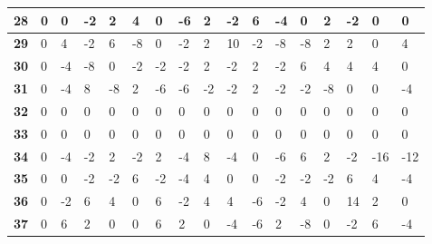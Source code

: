\begin{longtable}[c]{|l|l|l|l|l|l|l|l|l|l|l|l|l|l|l|l|l|}
\textbf{28} & 0          & 0          & -2         & 2          & 4          & 0          & -6         & 2          & -2         & 6          & -4          & 0           & 2           & -2          & 0           & 0           \\ \hline
\textbf{29} & 0          & 4          & -2         & 6          & -8         & 0          & -2         & 2          & 10         & -2         & -8          & -8          & 2           & 2           & 0           & 4           \\ \hline
\textbf{30} & 0          & -4         & -8         & 0          & -2         & -2         & -2         & 2          & -2         & 2          & -2          & 6           & 4           & 4           & 4           & 0           \\ \hline
\textbf{31} & 0          & -4         & 8          & -8         & 2          & -6         & -6         & -2         & -2         & 2          & -2          & -2          & -8          & 0           & 0           & -4          \\ \hline
\textbf{32} & 0          & 0          & 0          & 0          & 0          & 0          & 0          & 0          & 0          & 0          & 0           & 0           & 0           & 0           & 0           & 0           \\ \hline
\textbf{33} & 0          & 0          & 0          & 0          & 0          & 0          & 0          & 0          & 0          & 0          & 0           & 0           & 0           & 0           & 0           & 0           \\ \hline
\textbf{34} & 0          & -4         & -2         & 2          & -2         & 2          & -4         & 8          & -4         & 0          & -6          & 6           & 2           & -2          & -16         & -12         \\ \hline
\textbf{35} & 0          & 0          & -2         & -2         & 6          & -2         & -4         & 4          & 0          & 0          & -2          & -2          & -2          & 6           & 4           & -4          \\ \hline
\textbf{36} & 0          & -2         & 6          & 4          & 0          & 6          & -2         & 4          & 4          & -6         & -2          & 4           & 0           & 14          & 2           & 0           \\ \hline
\textbf{37} & 0          & 6          & 2          & 0          & 0          & 6          & 2          & 0          & -4         & -6         & 2           & -8          & 0           & -2          & 6           & -4          \\ \hline

\end{longtable}

